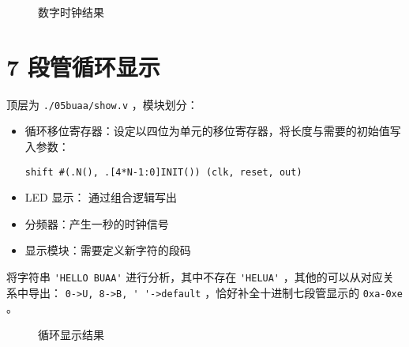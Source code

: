 \documentclass[lang=cn,11pt,a4paper,cite=authoryear]{elegantpaper}
\begin{document}
\begin{figure}
    \centering
    \caption{数字时钟结果}\label{04} 
     \hfill 
     \hfill
     \hfill 
     \bigskip 
\end{figure}

\section{7 段管循环显示}

顶层为 \lstinline{./05buaa/show.v} ，模块划分：

\begin{itemize}
    \item 循环移位寄存器：设定以四位为单元的移位寄存器，将长度与需要的初始值写入参数：

    \lstinline{shift #(.N(), .[4*N-1:0]INIT()) (clk, reset, out)} 
    \item LED 显示： 通过组合逻辑写出
    \item 分频器：产生一秒的时钟信号
    \item 显示模块：需要定义新字符的段码
\end{itemize}

将字符串 \lstinline{'HELLO BUAA'} 进行分析，其中不存在 \lstinline{'HELUA'} ，其他的可以从对应关系中导出： \lstinline{0->U, 8->B, ' '->default} ，恰好补全十进制七段管显示的 \lstinline{0xa-0xe} 。

\begin{figure}
    \centering
    \caption{循环显示结果}\label{05} 
     \hfill 
     \hfill 
     \hfill 
    
    \bigskip

     \hfill 
     \hfill 
     \hfill 
    
    \bigskip  
    
     \hfill 
     \hfill 
     \hfill 
\end{figure}
\end{document}

